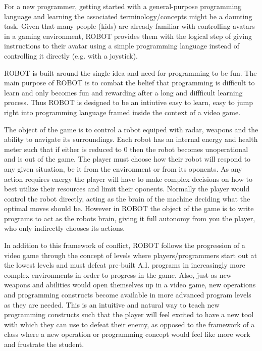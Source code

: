 \documentclass[a4paper]{article}
\begin{document}
For a new programmer, getting started with a general-purpose programming language and learning the associated terminology/concepts might be a daunting task.  Given that many people (kids) are already familiar with controlling avatars in a gaming environment, ROBOT provides them with the logical step of giving instructions to their avatar using a simple programming language instead of controlling it directly (e.g. with a joystick).

ROBOT is built around the single idea and need for programming to be fun. The main purpose of ROBOT is to combat the belief that programming is difficult to learn and only becomes fun and rewarding after a long and diffficult learning process. Thus ROBOT is designed to be an intiutive easy to learn, easy to jump right into programming language framed inside the context of a video game.

The object of the game is to control a robot equiped with radar, weapons and the ability to navigate its surroundings. Each robot has an internal energy and health meter such that if either is reduced to 0 then the robot becomes unoperational and is out of the game. The player must choose how their robot will respond to any given situation, be it from the environment or from its oponents. As any action requires energy the player will have to make complex decisions on how to best utilize their resources and limit their oponents. Normally the player would control the robot directly, acting as the brain of the machine deciding what the optimal moves should be. However in ROBOT the object of the game is to write programs to act as the robots brain, giving it full autonomy from you the player, who only indirectly chooses its actions.

In addition to this framework of conflict, ROBOT follows the progression of a video game through the concept of levels where players/programmers start out at the lowest levels and must defeat pre-built A.I. programs in increasingly more complex environments in order to progress in the game. Also, just as new weapons and abilities would open themselves up in a video game, new operations and programming constructs become available in more advanced program levels as they are needed. This is an intuitive and natural way to teach new programming constructs such that the player will feel excited to have a new tool with which they can use to defeat their enemy, as opposed to the framework of a class where a new operation or programming concept would feel like more work and frustrate the student.
\end{document}
